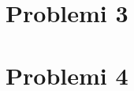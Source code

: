 \documentclass[a4paper]{article}
\begin{document}
        \section{Problemi 3}

        \section{Problemi 4}
\end{document}
